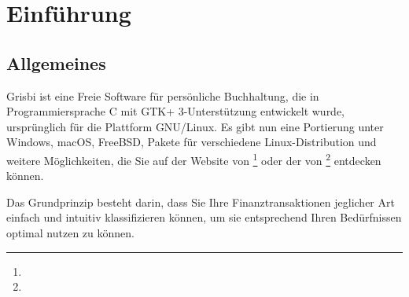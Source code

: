 
\chapter{Einführung\label{introduction}}


\section{Allgemeines\label{introduction-general}}


Grisbi ist eine \gls{Freie Software} für persönliche Buchhaltung, die in \gls{Programmiersprache C} mit \gls{GTK}+ 3-Unterstützung entwickelt wurde, ursprünglich für die Plattform {GNU/Linux}. Es gibt nun eine \gls{Portierung} unter \gls{Windows}, \gls{macOS}, FreeBSD, Pakete für verschiedene \gls{Linux-Distribution} und weitere Möglichkeiten, die Sie auf der Website von \footnote{\urlGrisbi{}} oder der von \footnote{\urlSourceForge{}} entdecken können.


Das Grundprinzip besteht darin, dass Sie Ihre Finanztransaktionen jeglicher Art einfach und intuitiv klassifizieren können, um sie entsprechend Ihren Bedürfnissen optimal nutzen zu können.

